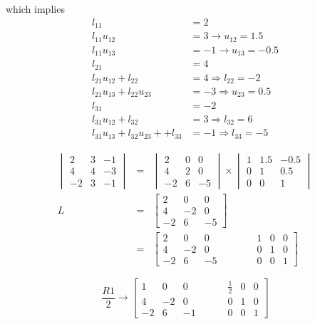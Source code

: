 \documentclass[a4paper,11pt]{article}
\begin{document}
which implies 
\begin{align*}
    l_{11} &= 2 \\
    l_{11}u_{12} &= 3 \rightarrow u_{12} = 1.5 \\
    l_{11} u_{13} &= -1 \rightarrow u_{13} = -0.5 \\
    l_{21} &= 4 \\
    l_{21} u_{12}+l_{22} &= 4 \Rightarrow l_{22} = -2 \\
    l_{21} u_{13} + l_{22} u_{23} &= -3 \Rightarrow u_{23} = 0.5 \\
    l_{31} &= -2 \\
    l_{31} u_{12} + l_{32} &= 3 \Rightarrow l_{32} = 6 \\
    l_{31} u_{13} + l_{32} u_{23} + + l_{33} &= -1 \Rightarrow l_{33} = -5
\end{align*}

\[
\begin{array}{rcl}
\begin{vmatrix}
2 & 3 & -1 \\
4 & 4 & -3 \\
-2 & 3 & -1
\end{vmatrix} &=& 
\begin{vmatrix}
2 & 0 & 0 \\
4 & 2 & 0 \\
-2 & 6 & -5
\end{vmatrix} \times 
\begin{vmatrix}
1 & 1.5 & -0.5 \\
0 & 1 & 0.5 \\
0 & 0 & 1
\end{vmatrix} \\ [8mm]
L &=& 
\begin{bmatrix}
2 & 0 & 0 \\
4 & -2 & 0 \\
-2 & 6 & -5
\end{bmatrix} \\ [8mm]
&=&
\begin{bmatrix}
2 & 0 & 0   &&&&& 1 & 0 & 0 \\
4 & -2 & 0  &&&&& 0 & 1 & 0 \\
-2 & 6 & -5 &&&&& 0 & 0 & 1
\end{bmatrix}
\end{array} 
\]

\[ \dfrac{R1}{2} \rightarrow \begin{bmatrix} 1 & 0 & 0 &&&& \frac{1}{2} & 0 & 0 \\ 4 & -2 & 0 &&&& 0 & 1 & 0 \\ -2 & 6 & -1 &&&& 0 & 0 & 1 \end{bmatrix} \]
\end{document}
